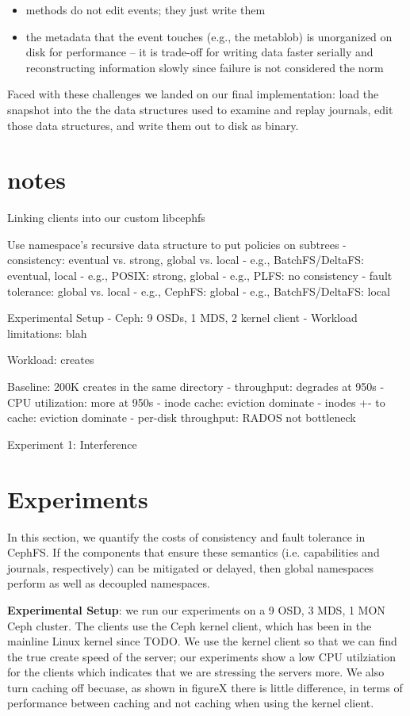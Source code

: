 \documentclass[preprint]{sigplanconf-eurosys}
\begin{document}
\begin{itemize}

  \item methods do not edit events; they just write them

  \item the metadata that the event touches (e.g., the metablob) is unorganized
  on disk for performance -- it is trade-off for writing data faster serially and
  reconstructing information slowly since failure is not considered the norm

\end{itemize}

Faced with these challenges we landed on our final implementation: load the
snapshot into the the data structures used to examine and replay journals, edit
those data structures, and write them out to disk as binary.

\section{notes}
Linking clients into our custom libcephfs

Use namespace's recursive data structure to put policies on subtrees
- consistency: eventual vs. strong, global vs. local
  - e.g., BatchFS/DeltaFS: eventual, local
  - e.g., POSIX: strong, global
  - e.g., PLFS: no consistency
- fault tolerance: global vs. local
  - e.g., CephFS: global
  - e.g., BatchFS/DeltaFS: local

Experimental Setup
- Ceph: 9 OSDs, 1 MDS, 2 kernel client
- Workload limitations: blah

Workload: creates

Baseline: 200K creates in the same directory
- throughput: degrades at 950s
- CPU utilization: more at 950s
- inode cache: eviction dominate
- inodes +- to cache: eviction dominate
- per-disk throughput: RADOS not bottleneck

Experiment 1: Interference

\section{Experiments}

In this section, we quantify the costs of consistency and fault tolerance in
CephFS. If the components that ensure these semantics (i.e. capabilities and
journals, respectively) can be mitigated or delayed, then global namespaces
perform as well as decoupled namespaces.

\textbf{Experimental Setup}: we run our experiments on a 9 OSD, 3 MDS, 1 MON
Ceph cluster. The clients use the Ceph kernel client, which has been in the
mainline Linux kernel since TODO. We use the kernel client so that we can find
the true create speed of the server; our experiments show a low CPU utilziation
for the clients which indicates that we are stressing the servers more. We also
turn caching off becuase, as shown in figureX there is little difference, in
terms of performance between caching and not caching when using the kernel
client.
\end{document}
